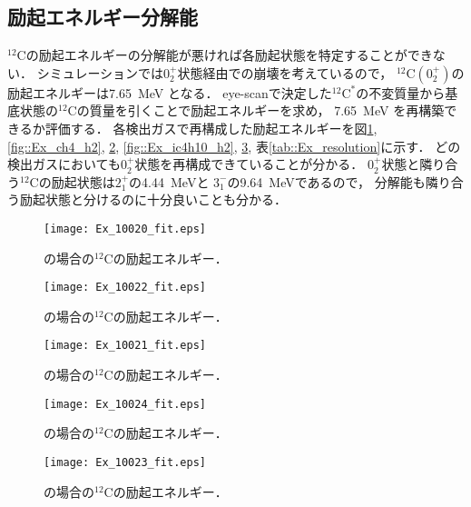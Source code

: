 \documentclass[../master]{subfiles}
\begin{document}
\subsection{励起エネルギー分解能}
${}^{12}\mathrm{C}$の励起エネルギーの分解能が悪ければ各励起状態を特定することができない．
シミュレーションでは$0_2^+$状態経由での崩壊を考えているので，
${}^{12}\mathrm{C}(0_2^+)$の励起エネルギーは\SI{7.65}{\mega\electronvolt} となる．
eye-scanで決定した${}^{12}\mathrm{C}^{*}$の不変質量から基底状態の${}^{12}\mathrm{C}$の質量を引くことで励起エネルギーを求め，
\SI{7.65}{\mega\electronvolt} を再構築できるか評価する．
各検出ガスで再構成した励起エネルギーを図\ref{fig::Ex_ch4}, \ref{fig::Ex_ch4_h2}, \ref{fig::Ex_ch4_he},
\ref{fig::Ex_ic4h10_h2}, \ref{fig::Ex_ic4h10_he}, 表\ref{tab::Ex_resolution}に示す．
どの検出ガスにおいても$0_2^+$状態を再構成できていることが分かる．
$0_2^+$状態と隣り合う${}^{12}\mathrm{C}$の励起状態は$2_1^+$の\SI{4.44}{\mega\electronvolt}と
$3_1^-$の\SI{9.64}{\mega\electronvolt}であるので，
分解能も隣り合う励起状態と分けるのに十分良いことも分かる．
\begin{figure}
  \centering
  \begin{minipage}{0.45\columnwidth}
    \centering
    \texttt{[image: Ex\_10020\_fit.eps]}
    \caption{\Methane の場合の${}^{12}\mathrm{C}$の励起エネルギー．}
    \label{fig::Ex_ch4}
  \end{minipage}
\end{figure}
\begin{figure}
  \centering
  \begin{minipage}{0.45\columnwidth}
    \centering
    \texttt{[image: Ex\_10022\_fit.eps]}
    \caption{\MethaneHydro の場合の${}^{12}\mathrm{C}$の励起エネルギー．}
    \label{fig::Ex_ch4_h2}
  \end{minipage}
  \begin{minipage}{0.45\columnwidth}
    \centering
    \texttt{[image: Ex\_10021\_fit.eps]}
    \caption{\MethaneHerium の場合の${}^{12}\mathrm{C}$の励起エネルギー．}
    \label{fig::Ex_ch4_he}
  \end{minipage}
\end{figure}
\begin{figure}
  \centering
  \begin{minipage}{0.45\columnwidth}
    \centering
    \texttt{[image: Ex\_10024\_fit.eps]}
    \caption{\isoButaneHydro の場合の${}^{12}\mathrm{C}$の励起エネルギー．}
    \label{fig::Ex_ic4h10_h2}
  \end{minipage}
  \begin{minipage}{0.45\columnwidth}
    \centering
    \texttt{[image: Ex\_10023\_fit.eps]}
    \caption{\isoButaneHerium の場合の${}^{12}\mathrm{C}$の励起エネルギー．}
    \label{fig::Ex_ic4h10_he}
  \end{minipage}
\end{figure}
\end{document}
